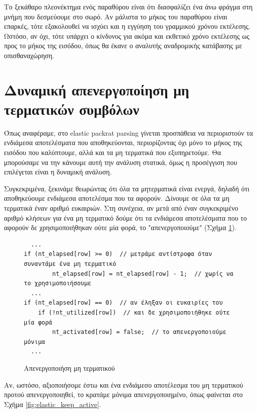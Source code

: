 Το ξεκάθαρο πλεονέκτημα ενός παραθύρου είναι ότι διασφαλίζει ένα άνω φράγμα στη μνήμη που δεσμεύουμε στο σωρό.
Αν μάλιστα το μήκος του παραθύρου είναι επαρκές, τότε εξακολουθεί να ισχύει και η εγγύηση του γραμμικού χρόνου εκτέλεσης.
Ωστόσο, αν όχι, τότε υπάρχει ο κίνδυνος για ακόμα και εκθετικό χρόνο εκτέλεσης ως προς το μήκος της εισόδου, όπως θα έκανε ο αναλυτής αναδρομικής κατάβασης με οπισθαναχώρηση.

\section{Δυναμική απενεργοποίηση μη τερματικών συμβόλων}

Όπως αναφέραμε, στο elastic packrat parsing γίνεται προσπάθεια να περιοριστούν τα ενδιάμεσα αποτελέσματα που αποθηκεύονται, περιορίζοντας όχι μόνο το μήκος της εισόδου που καλύπτουμε, αλλά και τα μη τερματικά που εξυπηρετούμε.
Θα μπορούσαμε να την κάνουμε αυτή την ανάλυση στατικά, όμως η προσέγγιση που επιλέγεται είναι η δυναμική ανάλυση.

Συγκεκριμένα, ξεκινάμε θεωρώντας ότι όλα τα μητερματικά είναι ενεργά, δηλαδή ότι αποθηκεύουμε ενδιάμεσα αποτελέσμα που τα αφορούν.
Δίνουμε σε όλα τα μη τερματικά έναν αριθμό ευκαιριών.
Στη συνέχεια, αν μετά από έναν συγκεκριμένο αριθμό κλήσεων για ένα μη τερματικό δούμε ότι τα ενδιάμεσα αποτελέσματα που το αφορούν δε χρησιμοποιήθηκαν ούτε μία φορά, το "απενεργοποιούμε" (Σχήμα \ref{fig:elastic_deactivate}).

\begin{figure}[h]
\setlength\partopsep{-\topsep}%
\begin{verbatim}
  ...
if (nt_elapsed[row] >= 0)  // μετράμε αντίστροφα όταν συναντάμε ένα μη τερματικό 
        nt_elapsed[row] = nt_elapsed[row] - 1;  // χωρίς να το χρησιμοποιήσουμε
  ...
if (nt_elapsed[row] == 0)  // αν έληξαν οι ευκαιρίες του
    if (!nt_utilized[row])  // και δε χρησιμοποιήθηκε ούτε μία φορά
        nt_activated[row] = false;  // το απενεργοποιούμε μόνιμα
  ...
\end{verbatim}
  \caption{Απενεργοποιήση μη τερματικού}
  \label{fig:elastic_deactivate}
\end{figure}

Αν, ωστόσο, αξιοποιήσομε έστω και ένα ενδιάμεσο αποτέλεσμα του μη τερματικού προτού απενεργοποιηθεί, το κρατάμε μόνιμα απενεργοποιημένο, όπως φαίνεται στο Σχήμα \ref{fig:elastic_keep_active}.


